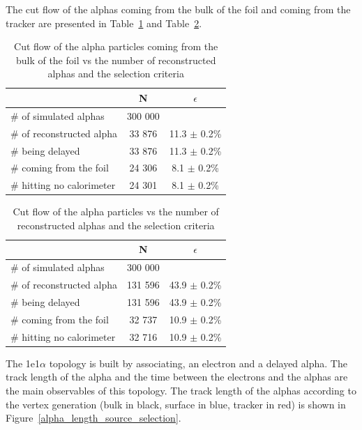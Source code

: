 \documentclass[main.tex]{subfiles}
\begin{document}
\bigskip


\noindent The cut flow of the alphas coming from the bulk of the foil and coming from the tracker are presented in Table~\ref{Cutflowalphabulk} and Table~\ref{Cutflowalphatrackerselection}. 


\begin{table}[h!]
\begin{center}
\begin{tabular}{l|c|c}
 & N & $\epsilon$ \\
\toprule
$\#$ of simulated alphas & 300 000 & \\
\hline
$\#$ of reconstructed alpha & 33 876 & 11.3 $\pm$ 0.2\% \\
$\#$ being delayed          & 33 876 & 11.3 $\pm$ 0.2\% \\
$\#$ coming from the foil   & 24 306 & 8.1  $\pm$ 0.2\% \\
$\#$ hitting no calorimeter & 24 301 & 8.1  $\pm$ 0.2\% \\
\bottomrule
\end{tabular}
\end{center}
\caption{Cut flow of the alpha particles coming from the bulk of the foil vs the number of reconstructed alphas and the selection criteria}
\label{Cutflowalphabulk}
\end{table}


\begin{table}[h!]
\begin{center}
\begin{tabular}{l|c|c}
 & N & $\epsilon$ \\
\toprule
$\#$ of simulated alphas & 300 000 & \\
\hline
$\#$ of reconstructed alpha & 131 596 & 43.9 $\pm$ 0.2\% \\
$\#$ being delayed          & 131 596 & 43.9 $\pm$ 0.2\% \\
$\#$ coming from the foil   & 32 737  & 10.9 $\pm$ 0.2\% \\
$\#$ hitting no calorimeter & 32 716  & 10.9 $\pm$ 0.2\% \\
\bottomrule
\end{tabular}
\end{center}
\caption{Cut flow of the alpha particles vs the number of reconstructed alphas and the selection criteria}
\label{Cutflowalphatrackerselection}
\end{table}


\bigskip


\noindent The 1e1$\alpha$ topology is built by associating, an electron and a delayed alpha. The track length of the alpha and the time between the electrons and the alphas are the main observables of this topology. The track length of the alphas according to the vertex generation (bulk in black, surface in blue, tracker in red) is shown in Figure~\ref{alpha_length_source_selection}.
\end{document}

